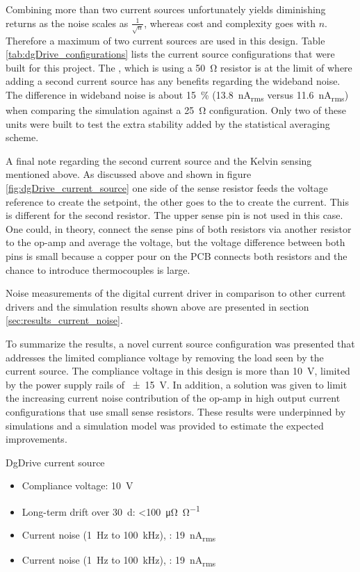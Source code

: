 Combining more than two current sources unfortunately yields diminishing returns as the noise scales as $\frac{1}{\sqrt{n}}$, whereas cost and complexity goes with $n$. Therefore a maximum of two current sources are used in this design. Table \ref{tab:dgDrive_configurations} lists the current source configurations that were built for this project. The , which is using a \qty{50}{\ohm} resistor is at the limit of where adding a second current source has any benefits regarding the wideband noise. The difference in wideband noise is about \qty{15}{\percent} (\qty{13.8}{\nA_{rms}} versus \qty{11.6}{\nA_{rms}}) when comparing the simulation against a \qty{25}{\ohm} configuration. Only two of these units were built to test the extra stability added by the statistical averaging scheme.

A final note regarding the second current source and the Kelvin sensing mentioned above. As discussed above and shown in figure \ref{fig:dgDrive_current_source} one side of the sense resistor feeds the voltage reference to create the setpoint, the other goes to the  to create the current. This is different for the second resistor. The upper sense pin is not used in this case. One could, in theory, connect the sense pins of both resistors via another resistor to the op-amp and average the voltage, but the voltage difference between both pins is small because a copper pour on the PCB connects both resistors and the chance to introduce thermocouples is large.

Noise measurements of the digital current driver in comparison to other current drivers and the simulation results shown above are presented in section \ref{sec:results_current_noise}.

To summarize the results, a novel current source configuration was presented that addresses the limited compliance voltage by removing the load seen by the current source. The compliance voltage in this design is more than \qty{10}{\V}, limited by the power supply rails of \qty{\pm 15}{\V}. In addition, a solution was given to limit the increasing current noise contribution of the op-amp in high output current configurations that use small sense resistors. These results were underpinned by simulations and a simulation model was provided to estimate the expected improvements.
\begin{center}
    \begin{deviceProperties}[label={lst:dgDrive_properties_current_source}]{DgDrive current source}
    \begin{itemize}
        \item Compliance voltage: \qty{10}{\V}
        \item Long-term drift over \qty{30}{\day}: \qty{<100}{\micro\ohm \per \ohm}
        \item Current noise (\qty{1}{\Hz} to \qty{100}{\kHz}), : \qty{19}{\nA_{rms}}
        \item Current noise (\qty{1}{\Hz} to \qty{100}{\kHz}), : \qty{19}{\nA_{rms}}
    \end{itemize}
    \end{deviceProperties}
\end{center}

